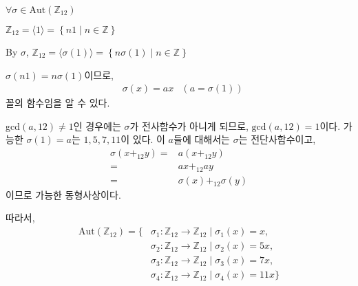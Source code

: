 \documentclass{article}
\begin{document}
$\forall \sigma \in \text{Aut}(\mathbb{Z}_{12})$

$\mathbb{Z}_{12} = \langle 1 \rangle = \left\{n1 \mid n \in \mathbb{Z} \right\}$

By $\sigma$, $\mathbb{Z}_{12} = \langle \sigma(1) \rangle = \left\{n\sigma(1) \mid n \in \mathbb{Z} \right\}$

$\sigma(n1) = n \sigma(1)$이므로, 
\begin{align*}
&\sigma(x) = ax &(a = \sigma(1))
\end{align*}꼴의 함수임을 알 수 있다.

gcd$(a, 12) \neq 1$인 경우에는 $\sigma$가 전사함수가 아니게 되므로, $\text{gcd}(a, 12) = 1$이다. 가능한 $\sigma(1) = a$는 $1, 5, 7, 11$이 있다. 이 $a$들에 대해서는 $\sigma$는 전단사함수이고,
\begin{align*}
\sigma(x +_{12} y) =& a(x+_{12}y)
\\ =& ax +_{12} ay
\\ =& \sigma(x) +_{12} \sigma(y)
\end{align*}이므로 가능한 동형사상이다.

따라서, 
\begin{align*}
\text{Aut}(\mathbb{Z}_{12}) = 
\{ &\sigma_{1} : \mathbb{Z}_{12} \rightarrow \mathbb{Z}_{12}  \mid \sigma_{1}(x) = x, 
\\ &\sigma_2 : \mathbb{Z}_{12} \rightarrow \mathbb{Z}_{12} \mid \sigma_2(x) = 5x, 
\\ &\sigma_3 : \mathbb{Z}_{12} \rightarrow \mathbb{Z}_{12} \mid \sigma_3(x) = 7x, 
\\ &\sigma_4 : \mathbb{Z}_{12} \rightarrow \mathbb{Z}_{12} \mid \sigma_4(x) = 11x  \}
\end{align*}
 
\end{document}
